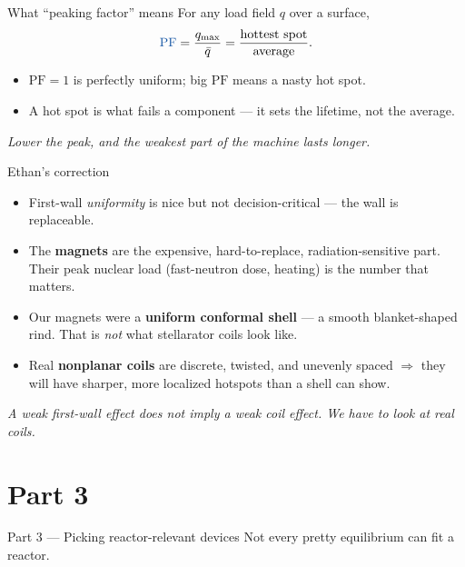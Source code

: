 \documentclass[11pt,aspectratio=169]{beamer}
\newcommand{\key}[1]{\textcolor{key}{\textbf{#1}}}
\newcommand{\qq}[1]{\begin{center}\emph{#1}\end{center}}
\begin{document}
\begin{frame}{What ``peaking factor'' means}
For any load field \(q\) over a surface,
\[
{\color{key}\mathrm{PF}} = \frac{q_{\max}}{\bar q}
= \frac{\text{hottest spot}}{\text{average}}.
\]
\begin{itemize}
\item \(\mathrm{PF}=1\) is perfectly uniform; big \(\mathrm{PF}\) means a nasty hot spot.
\item A hot spot is what fails a component --- it sets the lifetime, not the average.
\end{itemize}
\qq{Lower the peak, and the weakest part of the machine lasts longer.}
\end{frame}

\begin{frame}{Ethan's correction}
\begin{itemize}
\item First-wall \emph{uniformity} is nice but not decision-critical --- the wall is
      replaceable.
\item The \key{magnets} are the expensive, hard-to-replace, radiation-sensitive part. Their
      peak nuclear load (fast-neutron dose, heating) is the number that matters.
\item Our magnets were a \key{uniform conformal shell} --- a smooth blanket-shaped rind. That
      is \emph{not} what stellarator coils look like.
\item Real \key{nonplanar coils} are discrete, twisted, and unevenly spaced $\Rightarrow$
      they will have sharper, more localized hotspots than a shell can show.
\end{itemize}
\qq{A weak first-wall effect does not imply a weak \emph{coil} effect. We have to look at
real coils.}
\end{frame}

\section{Part 3}
\begin{frame}{Part 3 --- Picking reactor-relevant devices}\Large
Not every pretty equilibrium can fit a reactor.\end{frame}
\end{document}
